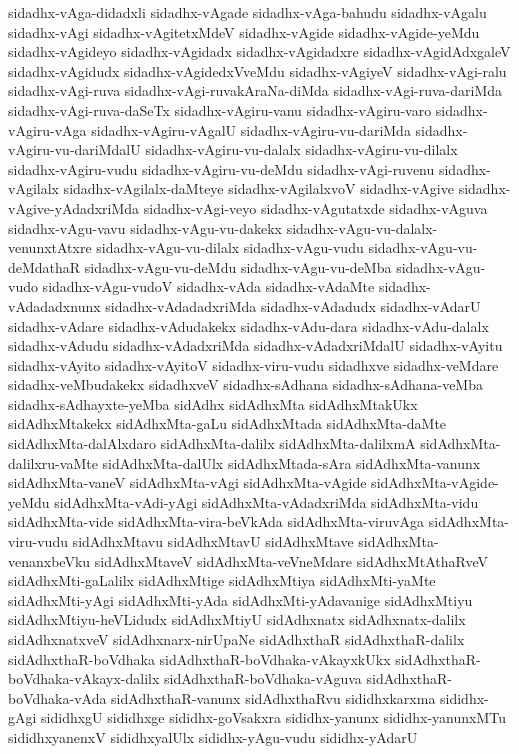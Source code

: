 {sidadhx-vAga-didadxli
sidadhx-vAgade
sidadhx-vAga-bahudu
sidadhx-vAgalu
sidadhx-vAgi
sidadhx-vAgitetxMdeV
sidadhx-vAgide
sidadhx-vAgide-yeMdu
sidadhx-vAgideyo
sidadhx-vAgidadx
sidadhx-vAgidadxre
sidadhx-vAgidAdxgaleV
sidadhx-vAgidudx
sidadhx-vAgidedxVveMdu
sidadhx-vAgiyeV
sidadhx-vAgi-ralu
sidadhx-vAgi-ruva
sidadhx-vAgi-ruvakAraNa-diMda
sidadhx-vAgi-ruva-dariMda
sidadhx-vAgi-ruva-daSeTx
sidadhx-vAgiru-vanu
sidadhx-vAgiru-varo
sidadhx-vAgiru-vAga
sidadhx-vAgiru-vAgalU
sidadhx-vAgiru-vu-dariMda
sidadhx-vAgiru-vu-dariMdalU
sidadhx-vAgiru-vu-dalalx
sidadhx-vAgiru-vu-dilalx
sidadhx-vAgiru-vudu
sidadhx-vAgiru-vu-deMdu
sidadhx-vAgi-ruvenu
sidadhx-vAgilalx
sidadhx-vAgilalx-daMteye
sidadhx-vAgilalxvoV
sidadhx-vAgive
sidadhx-vAgive-yAdadxriMda
sidadhx-vAgi-veyo
sidadhx-vAgutatxde
sidadhx-vAguva
sidadhx-vAgu-vavu
sidadhx-vAgu-vu-dakekx
sidadhx-vAgu-vu-dalalx-venunxtAtxre
sidadhx-vAgu-vu-dilalx
sidadhx-vAgu-vudu
sidadhx-vAgu-vu-deMdathaR
sidadhx-vAgu-vu-deMdu
sidadhx-vAgu-vu-deMba
sidadhx-vAgu-vudo
sidadhx-vAgu-vudoV
sidadhx-vAda
sidadhx-vAdaMte
sidadhx-vAdadadxnunx
sidadhx-vAdadadxriMda
sidadhx-vAdadudx
sidadhx-vAdarU
sidadhx-vAdare
sidadhx-vAdudakekx
sidadhx-vAdu-dara
sidadhx-vAdu-dalalx
sidadhx-vAdudu
sidadhx-vAdadxriMda
sidadhx-vAdadxriMdalU
sidadhx-vAyitu
sidadhx-vAyito
sidadhx-vAyitoV
sidadhx-viru-vudu
sidadhxve
sidadhx-veMdare
sidadhx-veMbudakekx
sidadhxveV
sidadhx-sAdhana
sidadhx-sAdhana-veMba
sidadhx-sAdhayxte-yeMba
sidAdhx
sidAdhxMta
sidAdhxMtakUkx
sidAdhxMtakekx
sidAdhxMta-gaLu
sidAdhxMtada
sidAdhxMta-daMte
sidAdhxMta-dalAlxdaro
sidAdhxMta-dalilx
sidAdhxMta-dalilxmA
sidAdhxMta-dalilxru-vaMte
sidAdhxMta-dalUlx
sidAdhxMtada-sAra
sidAdhxMta-vanunx
sidAdhxMta-vaneV
sidAdhxMta-vAgi
sidAdhxMta-vAgide
sidAdhxMta-vAgide-yeMdu
sidAdhxMta-vAdi-yAgi
sidAdhxMta-vAdadxriMda
sidAdhxMta-vidu
sidAdhxMta-vide
sidAdhxMta-vira-beVkAda
sidAdhxMta-viruvAga
sidAdhxMta-viru-vudu
sidAdhxMtavu
sidAdhxMtavU
sidAdhxMtave
sidAdhxMta-venanxbeVku
sidAdhxMtaveV
sidAdhxMta-veVneMdare
sidAdhxMtAthaRveV
sidAdhxMti-gaLalilx
sidAdhxMtige
sidAdhxMtiya
sidAdhxMti-yaMte
sidAdhxMti-yAgi
sidAdhxMti-yAda
sidAdhxMti-yAdavanige
sidAdhxMtiyu
sidAdhxMtiyu-heVLidudx
sidAdhxMtiyU
sidAdhxnatx
sidAdhxnatx-dalilx
sidAdhxnatxveV
sidAdhxnarx-nirUpaNe
sidAdhxthaR
sidAdhxthaR-dalilx
sidAdhxthaR-boVdhaka
sidAdhxthaR-boVdhaka-vAkayxkUkx
sidAdhxthaR-boVdhaka-vAkayx-dalilx
sidAdhxthaR-boVdhaka-vAguva
sidAdhxthaR-boVdhaka-vAda
sidAdhxthaR-vanunx
sidAdhxthaRvu
sididhxkarxma
sididhx-gAgi
sididhxgU
sididhxge
sididhx-goVsakxra
sididhx-yanunx
sididhx-yanunxMTu
sididhxyanenxV
sididhxyalUlx
sididhx-yAgu-vudu
sididhx-yAdarU
}
